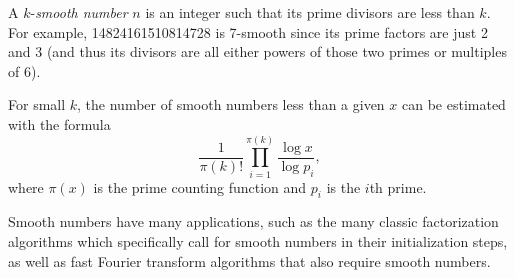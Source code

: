 \documentclass[12pt]{article}
\begin{document}
A $k$-{\em smooth number} $n$ is an integer such that its prime divisors are less than $k$. For example, 14824161510814728 is 7-smooth since its prime factors are just 2 and 3 (and thus its divisors are all either powers of those two primes or multiples of 6).

For small $k$, the number of smooth numbers less than a given $x$ can be estimated with the formula $$\frac{1}{\pi(k)!} \prod_{i = 1}^{\pi(k)} \frac{\log x}{\log p_i},$$ where $\pi(x)$ is the prime counting function and $p_i$ is the $i$th prime.

Smooth numbers have many applications, such as the many classic factorization algorithms which specifically call for smooth numbers in their initialization steps, as well as fast Fourier transform algorithms that also require smooth numbers.
\end{document}
